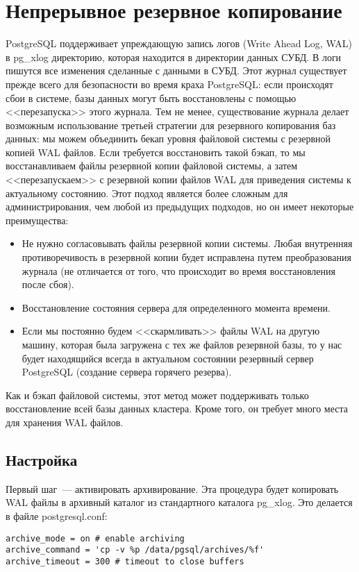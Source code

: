 \section{Непрерывное резервное копирование}
PostgreSQL поддерживает упреждающую запись логов (Write Ahead Log, WAL) в pg\_xlog директорию, которая находится в директории
данных СУБД.
В логи пишутся все изменения сделанные с данными в СУБД. Этот журнал существует прежде всего для безопасности во
время краха PostgreSQL: если происходят сбои в системе, базы данных могут быть восстановлены с помощью <<перезапуска>> этого
журнала. Тем не менее, существование журнала делает возможным использование третьей стратегии для резервного копирования
баз данных: мы можем объединить бекап уровня файловой системы с резервной копией WAL файлов. Если требуется восстановить такой бэкап, то
мы восстанавливаем файлы резервной копии файловой системы, а затем <<перезапускаем>> с резервной копии файлов WAL для приведения
системы к актуальному состоянию. Этот подход является более сложным для администрирования, чем любой из предыдущих подходов,
но он имеет некоторые преимущества:
\begin{itemize}
\item Не нужно согласовывать файлы резервной копии системы. Любая внутренняя противоречивость в резервной копии будет исправлена
путем преобразования журнала (не отличается от того, что происходит во время восстановления после сбоя).
\item Восстановление состояния сервера для определенного момента времени.
\item Если мы постоянно будем <<скармливать>> файлы WAL на другую машину, которая была загружена с тех же файлов резервной базы,
то у нас будет находящийся всегда в актуальном состоянии резервный сервер PostgreSQL (создание сервера горячего резерва).
\end{itemize}

Как и бэкап файловой системы, этот метод может поддерживать только восстановление всей базы данных кластера. Кроме того, он требует
много места для хранения WAL файлов.

\subsection{Настройка}
Первый шаг~--- активировать архивирование. Эта процедура будет копировать WAL файлы в архивный каталог из
стандартного каталога pg\_xlog. Это делается в файле postgresql.conf:
\begin{lstlisting}[label=lst:backups15,caption=Настройка архивирования]
archive_mode = on # enable archiving
archive_command = 'cp -v %p /data/pgsql/archives/%f'
archive_timeout = 300 # timeout to close buffers
\end{lstlisting}

